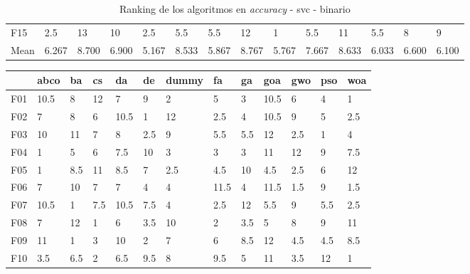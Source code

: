 \begin{table}
\begin{adjustbox}{width=\linewidth}
\begin{tabular}{llllllllllllll}
            F15  & 2.5   & 13    & 10    & 2.5   & 5.5   & 5.5   & 12    & 1     & 5.5   & 11    & 5.5   & 8     & 9     \\
            Mean & 6.267 & 8.700 & 6.900 & 5.167 & 8.533 & 5.867 & 8.767 & 5.767 & 7.667 & 8.633 & 6.033 & 6.600 & 6.100 \\
            \bottomrule
        \end{tabular}
    \end{adjustbox}
    \caption{Ranking de los algoritmos en \textit{accuracy} - svc - binario}
    \label{tab:ranking_accuracy_bin_svc}
\end{table}

\begin{table}
    \centering
    \begin{adjustbox}{width=\linewidth}
        \begin{tabular}{lllllllllllll}
            \toprule
            {}   & abco  & ba    & cs    & da    & de    & dummy & fa    & ga    & goa   & gwo   & pso   & woa   \\
            \midrule
            F01  & 10.5  & 8     & 12    & 7     & 9     & 2     & 5     & 3     & 10.5  & 6     & 4     & 1     \\
            F02  & 7     & 8     & 6     & 10.5  & 1     & 12    & 2.5   & 4     & 10.5  & 9     & 5     & 2.5   \\
            F03  & 10    & 11    & 7     & 8     & 2.5   & 9     & 5.5   & 5.5   & 12    & 2.5   & 1     & 4     \\
            F04  & 1     & 5     & 6     & 7.5   & 10    & 3     & 3     & 3     & 11    & 12    & 9     & 7.5   \\
            F05  & 1     & 8.5   & 11    & 8.5   & 7     & 2.5   & 4.5   & 10    & 4.5   & 2.5   & 6     & 12    \\
            F06  & 7     & 10    & 7     & 7     & 4     & 4     & 11.5  & 4     & 11.5  & 1.5   & 9     & 1.5   \\
            F07  & 10.5  & 1     & 7.5   & 10.5  & 7.5   & 4     & 2.5   & 12    & 5.5   & 9     & 5.5   & 2.5   \\
            F08  & 7     & 12    & 1     & 6     & 3.5   & 10    & 2     & 3.5   & 5     & 8     & 9     & 11    \\
            F09  & 11    & 1     & 3     & 10    & 2     & 7     & 6     & 8.5   & 12    & 4.5   & 4.5   & 8.5   \\
            F10  & 3.5   & 6.5   & 2     & 6.5   & 9.5   & 8     & 9.5   & 5     & 11    & 3.5   & 12    & 1     \\

\end{tabular}
\end{adjustbox}
\end{table}
